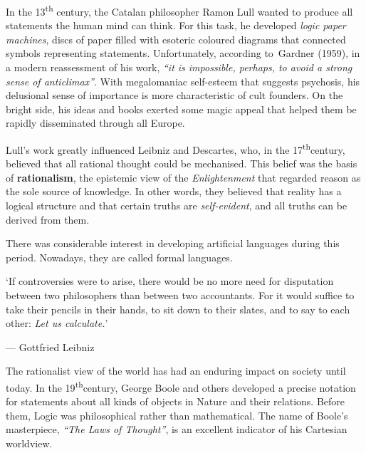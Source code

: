 \documentclass[
  letterpaper,
  12pt,
  british]{tufte-book}
\renewenvironment{quote}{
  \list{}{\leftmargin=3.5cm\topsep=0pt}
  \item\relax\small\itshape
}
{\endlist}
\theoremstyle{plain}
\theoremstyle{definition}
\theoremstyle{plain}
\theoremstyle{remark}
\begin{document}
In the 13\textsuperscript{th} century, the Catalan philosopher Ramon
Lull wanted to produce all statements the human mind can think. For this
task, he developed \emph{logic paper machines}, discs of paper filled
with esoteric coloured diagrams that connected symbols representing
statements. Unfortunately, according to~Gardner
(1959),
in a modern reassessment of his work, \emph{``it is impossible, perhaps,
to avoid a strong sense of anticlimax''}. With megalomaniac self-esteem
that suggests psychosis, his delusional sense of importance is more
characteristic of cult founders. On the bright side, his ideas and books
exerted some magic appeal that helped them be rapidly disseminated
through all Europe.

Lull's work greatly influenced Leibniz and Descartes, who, in the
17\textsuperscript{th}century, believed that all rational thought could
be mechanised. This belief was the basis of \textbf{rationalism}, the
epistemic view of the \emph{Enlightenment} that regarded reason as the
sole source of knowledge. In other words, they believed that reality has
a logical structure and that certain truths are \emph{self-evident}, and
all truths can be derived from them.

There was considerable interest in developing artificial languages
during this period. Nowadays, they are called formal languages.

\begin{quote}
`If controversies were to arise, there would be no more need for
disputation between two philosophers than between two accountants. For
it would suffice to take their pencils in their hands, to sit down to
their slates, and to say to each other: \emph{Let us calculate.}'

--- Gottfried Leibniz
\end{quote}

The rationalist view of the world has had an enduring impact on society
until today. In the 19\textsuperscript{th}century, George Boole and
others developed a precise notation for statements about all kinds of
objects in Nature and their relations. Before them, Logic was
philosophical rather than mathematical. The name of Boole's masterpiece,
\emph{``The Laws of Thought''}, is an excellent indicator of his
Cartesian worldview.
\end{document}
